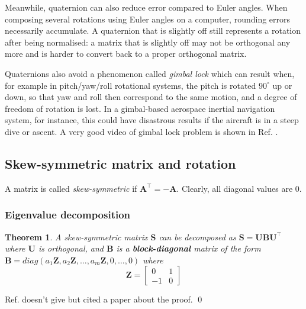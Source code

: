 \documentclass[12pt]{article}
\newtheorem{theorem}{Theorem}[section]
\numberwithin{equation}{section}
\renewenvironment{proof}{{\bfseries Proof.}}{\qed \\}
\begin{document}
Meanwhile, quaternion can also reduce error compared to Euler angles. When composing several rotations using Euler angles on a computer, rounding errors necessarily accumulate. A quaternion that is slightly off still represents a rotation after being normalised: a matrix that is slightly off may not be orthogonal any more and is harder to convert back to a proper orthogonal matrix.

Quaternions also avoid a phenomenon called \textit{gimbal lock} which can result when, for example in pitch/yaw/roll rotational systems, the pitch is rotated $90^{\circ}$ up or down, so that yaw and roll then correspond to the same motion, and a degree of freedom of rotation is lost. In a gimbal-based aerospace inertial navigation system, for instance, this could have disastrous results if the aircraft is in a steep dive or ascent. A very good video of gimbal lock problem is shown in Ref. \cite{gimbalock}.

\subsection{Skew-symmetric matrix and rotation}
\label{sec:skew}

A matrix is called \textit{skew-symmetric} if $\mathbf{A}^\top = - \mathbf{A}$. Clearly, all diagonal values are 0.

\subsubsection{Eigenvalue decomposition}

\begin{theorem}
A skew-symmetric matrix $\mathbf{S}$ can be decomposed as $\mathbf{S} = \mathbf{U}\mathbf{B}\mathbf{U}^\top$ where $\mathbf{U}$ is orthogonal, and $\mathbf{B}$ is a \textbf{block-diagonal} matrix of the form $\mathbf{B} = diag(a_1\mathbf{Z}, a_2\mathbf{Z}, \dots, a_m\mathbf{Z}, 0, \dots, 0)$ where
\begin{equation*}
\mathbf{Z} =
\begin{bmatrix}
0 & 1 \\
-1 & 0
\end{bmatrix}
\end{equation*}
\label{theorem:skew_eigen_decomp}
\end{theorem}

\begin{proof}
Ref. \citep{hartley2003multiple} doesn't give but cited a paper about the proof.
\end{proof}
\end{document}
